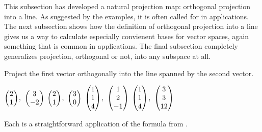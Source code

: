 This subsection has developed a natural projection map: orthogonal projection
into a line.
As suggested by the examples, it is often called for in applications.
The next subsection shows how the definition of orthogonal
projection into a line gives us a way to calculate especially convienent bases
for vector spaces, again something that is common in applications.
The final subsection completely generalizes projection, orthogonal or not, 
into any subspace at all.

\begin{exercises}
  \recommended \item
    Project the first vector orthogonally
    into the line spanned by the second vector.
    \begin{exparts*}
      \partsitem \mbox{\( \begin{pmatrix} 2 \\ 1 \end{pmatrix} \), \( \begin{pmatrix} 3 \\ -2 \end{pmatrix} \)}
      \partsitem \mbox{\( \begin{pmatrix} 2 \\ 1 \end{pmatrix} \), \( 
            \begin{pmatrix} 3 \\ 0 \end{pmatrix} \)}
      \partsitem \mbox{\( \begin{pmatrix} 1 \\ 1 \\ 4 \end{pmatrix} \), \( 
         \begin{pmatrix} 1 \\ 2 \\ -1 \end{pmatrix} \)}
      \partsitem \mbox{\( \begin{pmatrix} 1 \\ 1 \\ 4 \end{pmatrix} \), \( 
         \begin{pmatrix} 3 \\ 3 \\ 12 \end{pmatrix} \)}
    \end{exparts*}
    \begin{answer}
       Each is a straightforward application of the formula from 
       .
\end{answer}
\end{exercises}
